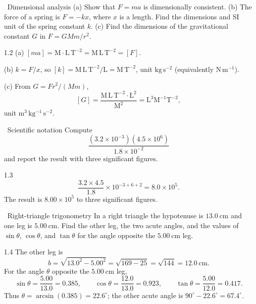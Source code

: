 \begin{exercise}{\warm\ Dimensional analysis}
(a) Show that $F=ma$ is dimensionally consistent. (b) The force of a spring is
$F=-kx$, where $x$ is a length. Find the dimensions and SI unit of the spring
constant $k$. (c) Find the dimensions of the gravitational constant $G$ in
$F=GMm/r^2$.
\end{exercise}

\begin{tabletworkspace}[6cm]
\end{tabletworkspace}

\begin{solution}{1.2}
(a) $[ma]=\mathrm{M}\cdot\mathrm{L\,T^{-2}}=\mathrm{M\,L\,T^{-2}}=[F]$.

(b) $k=F/x$, so $[k]=\mathrm{M\,L\,T^{-2}}/\mathrm{L}
=\mathrm{M\,T^{-2}}$, unit $\mathrm{kg\,s^{-2}}$ (equivalently $\mathrm{N\,m^{-1}}$).

(c) From $G=Fr^2/(Mm)$,
\[
[G]=\frac{\mathrm{M\,L\,T^{-2}}\cdot\mathrm{L^2}}{\mathrm{M^2}}
=\mathrm{L^3M^{-1}T^{-2}},
\]
unit $\mathrm{m^3\,kg^{-1}\,s^{-2}}$.
\end{solution}

\begin{exercise}{\warm\ Scientific notation}
Compute
\[
\frac{(3.2\times10^{-3})(4.5\times10^{6})}{1.8\times10^{-2}}
\]
and report the result with three significant figures.
\end{exercise}

\begin{tabletworkspace}[6cm]
\end{tabletworkspace}

\begin{solution}{1.3}
\[
\frac{3.2\times4.5}{1.8}\times10^{-3+6+2}
=8.0\times10^{5}.
\]
The result is $8.00\times10^{5}$ to three significant figures.
\end{solution}

\begin{exercise}{\core\ Right-triangle trigonometry}
In a right triangle the hypotenuse is $13.0\ \mathrm{cm}$ and one leg is
$5.00\ \mathrm{cm}$. Find the other leg, the two acute angles, and the values of
$\sin\theta$, $\cos\theta$, and $\tan\theta$ for the angle opposite the $5.00\ \mathrm{cm}$ leg.
\end{exercise}

\begin{tabletworkspace}[6cm]
\end{tabletworkspace}

\begin{solution}{1.4}
The other leg is
\[
b=\sqrt{13.0^2-5.00^2}=\sqrt{169-25}=\sqrt{144}=12.0\ \mathrm{cm}.
\]
For the angle $\theta$ opposite the $5.00\ \mathrm{cm}$ leg,
\[
\sin\theta=\frac{5.00}{13.0}=0.385,\qquad
\cos\theta=\frac{12.0}{13.0}=0.923,\qquad
\tan\theta=\frac{5.00}{12.0}=0.417.
\]
Thus $\theta=\arcsin(0.385)=22.6^\circ$; the other acute angle is
$90^\circ-22.6^\circ=67.4^\circ$.
\end{solution}

